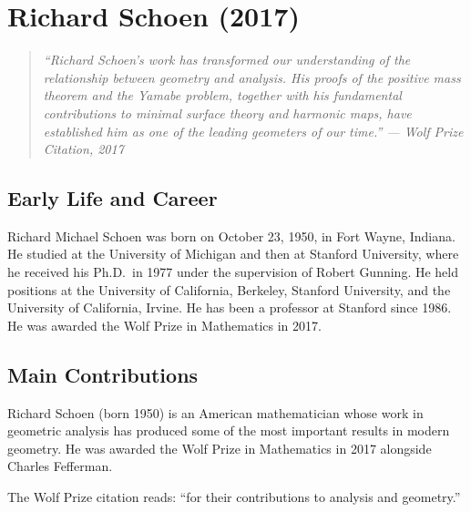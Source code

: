 
\chapter{Richard Schoen (2017)}

\begin{quote}
\it ``Richard Schoen's work has transformed our understanding of the relationship between geometry and analysis. His proofs of the positive mass theorem and the Yamabe problem, together with his fundamental contributions to minimal surface theory and harmonic maps, have established him as one of the leading geometers of our time.'' --- Wolf Prize Citation, 2017
\end{quote}

\section{Early Life and Career}

Richard Michael Schoen was born on October 23, 1950, in Fort Wayne, Indiana. He studied at the University of Michigan and then at Stanford University, where he received his Ph.D.\ in 1977 under the supervision of Robert Gunning. He held positions at the University of California, Berkeley, Stanford University, and the University of California, Irvine. He has been a professor at Stanford since 1986. He was awarded the Wolf Prize in Mathematics in 2017.

\section{Main Contributions}

Richard Schoen (born 1950) is an American mathematician whose work in geometric analysis has produced some of the most important results in modern geometry. He was awarded the Wolf Prize in Mathematics in 2017 alongside Charles Fefferman.

The Wolf Prize citation reads: ``for their contributions to analysis and geometry.''

